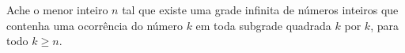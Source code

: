 Ache o menor inteiro $n$ tal que existe uma grade infinita de números inteiros que contenha uma ocorrência do número $k$ em toda subgrade quadrada $k$ por $k$, para todo $k \ge n$.	
